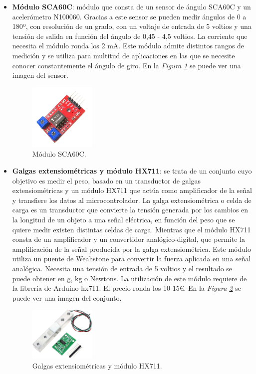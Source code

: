 \begin{itemize}
    \item \textbf{Módulo SCA60C}\cite{SCA60C}: módulo que consta de un sensor de ángulo SCA60C y un acelerómetro N100060. Gracias a este sensor se pueden medir ángulos de 0 a 180º, con resolución de un grado, con un voltaje de entrada de 5 voltios y una tensión de salida en función del ángulo de 0,45 - 4,5 voltios. La corriente que necesita el módulo ronda los 2 mA. Este módulo admite distintos rangos de medición y se utiliza para multitud de aplicaciones en las que se necesite conocer constantemente el ángulo de giro. En la \textit{Figura \ref{fig:SCA60C}} se puede ver una imagen del sensor.
\begin{figure}[h!]
    \centering
    \includegraphics[width=0.3\textwidth]{img/imgSCA60C.jpg}
    \caption{Módulo SCA60C\cite{imgSCA60C}.}
    \label{fig:SCA60C} 
\end{figure}
    
    \item \textbf{Galgas extensiométricas y módulo HX711}\cite{GyHX711_1,GyHX711_2}: se trata de un conjunto cuyo objetivo es medir el peso, basado en un transductor de galgas extensiométricas y un módulo HX711 que actúa como amplificador de la señal y transfiere los datos al microcontrolador. La galga extensiométrica o celda de carga es un transductor que convierte la tensión generada por los cambios en la longitud de un objeto a una señal eléctrica, en función del peso que se quiere medir existen distintas celdas de carga. Mientras que el módulo HX711 consta de un amplificador y un convertidor analógico-digital, que permite la amplificación de la señal producida por la galga extensiométrica. Este módulo utiliza un puente de Weahstone para convertir la fuerza aplicada en una señal analógica. Necesita una tensión de entrada de 5 voltios y el resultado se puede obtener en g, kg o Newtons. La utilización de este módulo requiere de la librería de Arduino hx711. El precio ronda los 10-15€. En la \textit{Figura \ref{fig:HX711}} se puede ver una imagen del conjunto.
\begin{figure}[h!]
    \centering
    \includegraphics[width=0.3\textwidth]{img/GyHX711.jpg}
    \caption{Galgas extensiométricas y módulo HX711\cite{imgGyHX711}.}
    \label{fig:HX711} 
\end{figure}


\end{itemize}
